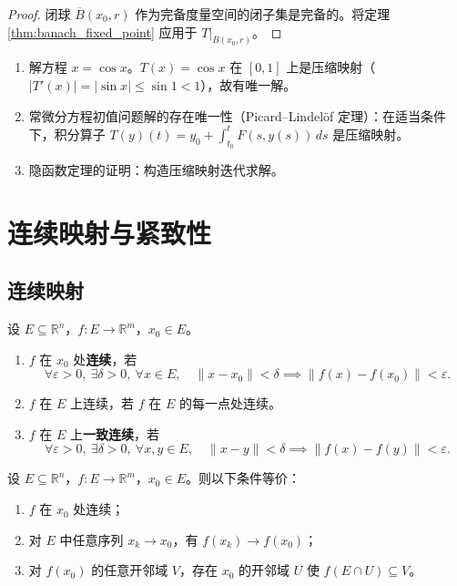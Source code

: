 \begin{proof}
闭球 $\overline{B}(x_0, r)$ 作为完备度量空间的闭子集是完备的。将定理 \ref{thm:banach_fixed_point} 应用于 $T|_{\overline{B}(x_0, r)}$。
\end{proof}

\begin{example}[压缩映射原理的应用]\label{ex:contraction_applications}
\begin{enumerate}[label=(\roman*)]
    \item 解方程 $x = \cos x$。$T(x) = \cos x$ 在 $[0, 1]$ 上是压缩映射（$|T'(x)| = |\sin x| \le \sin 1 < 1$），故有唯一解。
    \item 常微分方程初值问题解的存在唯一性（Picard--Lindelöf 定理）：在适当条件下，积分算子 $T(y)(t) = y_0 + \int_{t_0}^t F(s, y(s)) \, ds$ 是压缩映射。
    \item 隐函数定理的证明：构造压缩映射迭代求解。
\end{enumerate}
\end{example}

\section{连续映射与紧致性}

\subsection{连续映射}

\begin{definition}[连续映射]\label{def:continuous_map}
设 $E \subseteq \mathbb{R}^n$，$f: E \to \mathbb{R}^m$，$x_0 \in E$。
\begin{enumerate}[label=(\roman*)]
    \item $f$ 在 $x_0$ 处\textbf{连续}，若
    \[
    \forall \varepsilon > 0,\ \exists \delta > 0,\ \forall x \in E,\quad \|x - x_0\| < \delta \implies \|f(x) - f(x_0)\| < \varepsilon.
    \]
    \item $f$ 在 $E$ 上连续，若 $f$ 在 $E$ 的每一点处连续。
    \item $f$ 在 $E$ 上\textbf{一致连续}，若
    \[
    \forall \varepsilon > 0,\ \exists \delta > 0,\ \forall x, y \in E,\quad \|x - y\| < \delta \implies \|f(x) - f(y)\| < \varepsilon.
    \]
\end{enumerate}
\end{definition}

\begin{proposition}[连续性的等价刻画]\label{prop:continuity_equivalent}
设 $E \subseteq \mathbb{R}^n$，$f: E \to \mathbb{R}^m$，$x_0 \in E$。则以下条件等价：
\begin{enumerate}[label=(\roman*)]
    \item $f$ 在 $x_0$ 处连续；
    \item 对 $E$ 中任意序列 $x_k \to x_0$，有 $f(x_k) \to f(x_0)$；
    \item 对 $f(x_0)$ 的任意开邻域 $V$，存在 $x_0$ 的开邻域 $U$ 使 $f(E \cap U) \subseteq V$。
\end{enumerate}
\end{proposition}

